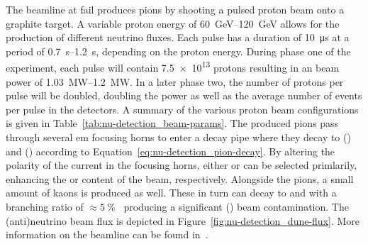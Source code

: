 The beamline at \gls{fail} produces pions by shooting a pulsed proton beam onto a graphite target.
A variable proton energy of \SIrange{60}{120}{\giga\electronvolt} allows for the production of different neutrino fluxes.
Each pulse has a duration of \SI{10}{\micro\second} at a period of \SIrange{0.7}{1.2}{\second}, depending on the proton energy.
During phase one of the experiment, each pulse will contain \num{7.5e13} protons resulting in an beam power of \SIrange{1.03}{1.2}{\mega\watt}.
In a later phase two, the number of protons per pulse will be doubled, doubling the power as well as the average number of events per pulse in the detectors.
A summary of the various proton beam configurations is given in Table~\ref{tab:nu-detection_beam-params}.
The produced pions pass through several \gls{em} focusing horns to enter a decay pipe where they decay to \Pgmp(\Pgmm) and \Pgngm(\Pagngm) according to Equation~\eqref{eq:nu-detection_pion-decay}.
By altering the polarity of the current in the focusing horns, either \Pgpp or \Pgpm can be selected primlarily, enhancing the \Pgngm or \Pagngm content of the beam, respectively.
Alongside the pions, a small amount of kaons is produced as well.
These in turn can decay to \Pgne and \Pagne with a branching ratio of $\approx\SI{5}{\percent}$~\cite{pdg} producing a significant \Pgne (\Pagne) beam contamination.
The (anti)neutrino beam flux is depicted in Figure~\ref{fig:nu-detection_dune-flux}.
More information on the beamline can be found in~\cite{dune2}.

